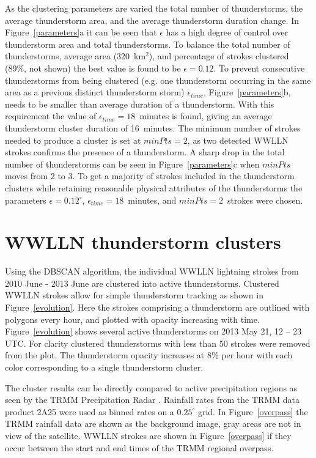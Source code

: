 As the clustering parameters are varied the total number of thunderstorms, the average thunderstorm area, and the average thunderstorm duration change.
In Figure~\ref{parameters}a it can be seen that $\epsilon$ has a high degree of control over thunderstorm area and total thunderstorms.
To balance the total number of thunderstorms, average area (320~km$^2$), and percentage of strokes clustered (89\%, not shown) the best value is found to be $\epsilon = 0.12$.
To prevent consecutive thunderstorms from being clustered (e.g. one thunderstorm occurring in the same area as a previous distinct thunderstorm storm) $\epsilon_{time}$, Figure~\ref{parameters}b, needs to be smaller than average duration of a thunderstorm.
With this requirement the value of $\epsilon_{time} = 18$~minutes is found, giving an average thunderstorm cluster duration of 16~minutes.
The minimum number of strokes needed to produce a cluster is set at $minPts = 2$, as two detected WWLLN strokes confirms the presence of a thunderstorm.
A sharp drop in the total number of thunderstorms can be seen in Figure~\ref{parameters}c when $minPts$ moves from 2 to 3.
To get a majority of strokes included in the thunderstorm clusters while retaining reasonable physical attributes of the thunderstorms the parameters $\epsilon = 0.12^\circ$, $\epsilon_{time} = 18$~minutes, and $minPts = 2$~strokes were chosen.
 
\section{WWLLN thunderstorm clusters}

Using the DBSCAN algorithm, the individual WWLLN lightning strokes from 2010 June - 2013 June are clustered into active thunderstorms.
Clustered WWLLN strokes allow for simple thunderstorm tracking as shown in Figure~\ref{evolution}.
Here the strokes comprising a thunderstorm are outlined with polygons every hour, and plotted with opacity increasing with time.
Figure~\ref{evolution} shows several active thunderstorms on 2013 May 21, 12 -- 23 UTC.
For clarity clustered thunderstorms with less than 50 strokes were removed from the plot.
The thunderstorm opacity increases at 8\% per hour with each color corresponding to a single thunderstorm cluster.

The cluster results can be directly compared to active precipitation regions as seen by the TRMM Precipitation Radar \citep{Kawanishi2000}.
Rainfall rates from the TRMM data product 2A25 were used as binned rates on a $0.25^\circ$ grid.
In Figure~\ref{overpass} the TRMM rainfall data are shown as the background image, gray areas are not in view of the satellite.
WWLLN strokes are shown in Figure~\ref{overpass} if they occur between the start and end times of the TRMM regional overpass.

